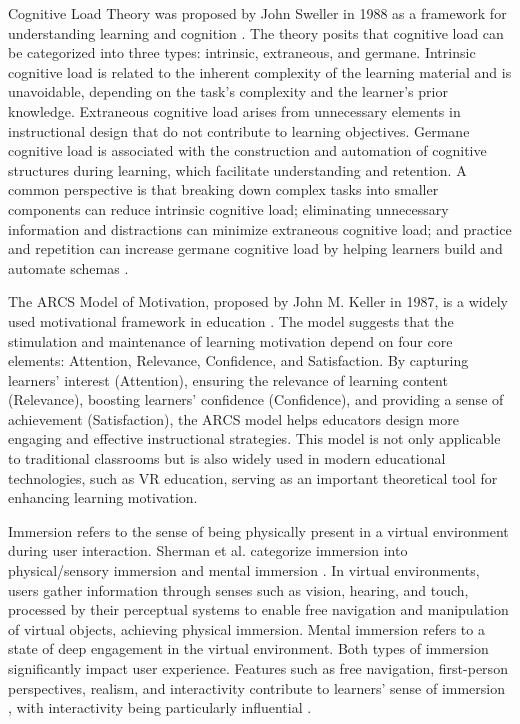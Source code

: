 \documentclass[runningheads]{llncs}
\begin{document}
Cognitive Load Theory was proposed by John Sweller in 1988 as a framework for understanding learning and cognition \cite{sweller1988cognitive}. The theory posits that cognitive load can be categorized into three types: intrinsic, extraneous, and germane. Intrinsic cognitive load is related to the inherent complexity of the learning material and is unavoidable, depending on the task's complexity and the learner's prior knowledge. Extraneous cognitive load arises from unnecessary elements in instructional design that do not contribute to learning objectives. Germane cognitive load is associated with the construction and automation of cognitive structures during learning, which facilitate understanding and retention. A common perspective is that breaking down complex tasks into smaller components can reduce intrinsic cognitive load; eliminating unnecessary information and distractions can minimize extraneous cognitive load; and practice and repetition can increase germane cognitive load by helping learners build and automate schemas \cite{baceviciute2022investigating}.

The ARCS Model of Motivation, proposed by John M. Keller in 1987, is a widely used motivational framework in education \cite{keller1987development}. The model suggests that the stimulation and maintenance of learning motivation depend on four core elements: Attention, Relevance, Confidence, and Satisfaction. By capturing learners' interest (Attention), ensuring the relevance of learning content (Relevance), boosting learners' confidence (Confidence), and providing a sense of achievement (Satisfaction), the ARCS model helps educators design more engaging and effective instructional strategies. This model is not only applicable to traditional classrooms but is also widely used in modern educational technologies, such as VR education, serving as an important theoretical tool for enhancing learning motivation.

Immersion refers to the sense of being physically present in a virtual environment during user interaction. Sherman et al. categorize immersion into physical/sensory immersion and mental immersion \cite{sherman2003understanding}. In virtual environments, users gather information through senses such as vision, hearing, and touch, processed by their perceptual systems to enable free navigation and manipulation of virtual objects, achieving physical immersion. Mental immersion refers to a state of deep engagement in the virtual environment. Both types of immersion significantly impact user experience. Features such as free navigation, first-person perspectives, realism, and interactivity contribute to learners' sense of immersion \cite{regenbrecht2002real,mikropoulos2006presence}, with interactivity being particularly influential \cite{schubert2001experience}.
\end{document}
